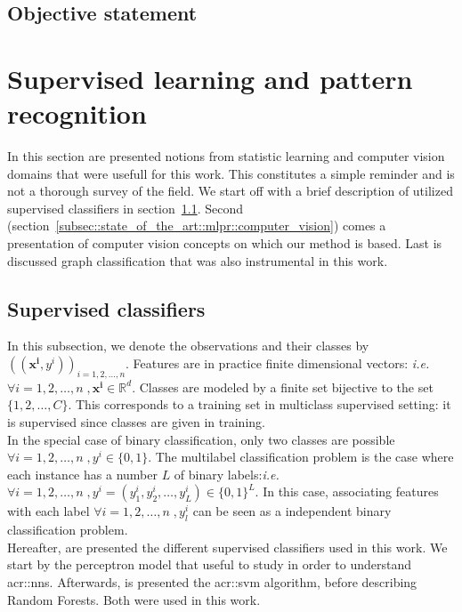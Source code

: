     \subsection{Objective statement}
\section{Supervised learning and pattern recognition}
    \label{sec::state_of_the_art::mlpr}
    In this section are presented notions from statistic learning and computer vision domains that were usefull for this work.
    This constitutes a simple reminder and is not a thorough survey of the field.
    We start off with a brief description of utilized supervised classifiers in section~\ref{subsec::state_of_the_art::mlpr::classifiers}.
    Second (section~\ref{subsec::state_of_the_art::mlpr::computer_vision}) comes a presentation of computer vision concepts on which our method is based.
    Last is discussed graph classification that was also instrumental in this work.

    \subsection{Supervised classifiers}
        \label{subsec::state_of_the_art::mlpr::classifiers}
        In this subsection, we denote the observations and their classes by $\left((\bm{x^i}, y^i)\right)_{i=1,2,\dots,n}$.
        Features are in practice finite dimensional vectors: \textit{i.e.} $\forall i=1,2,\dots,n \;, \bm{x^i} \in \mathbb{R}^d$.
        Classes are modeled by a finite set bijective to the set $\{1,2,\dots,C\}$.
        This corresponds to a training set in multiclass supervised setting: it is supervised since classes are given in training.\\

        In the special case of binary classification, only two classes are possible $\forall i=1,2,\dots,n \;,\allowbreak y^i \in \{0, 1\}$.
        The multilabel classification problem is the case where each instance has a number $L$ of binary labels:\textit{i.e.} $\forall i=1,2,\dots,n \;, y^i = (y^i_1, y^i_2, \dots, y^i_L) \in \{0, 1\}^L$.
        In this case, associating features with each label $\forall i=1,2,\dots,n \;, y^i_l$ can be seen as a independent binary classification problem.\\

        Hereafter, are presented the different supervised classifiers used in this work.
        We start by the perceptron model that useful to study in order to understand \glspl{acr::nn}.
        Afterwards, is presented the \gls{acr::svm} algorithm, before describing Random Forests.
        Both were used in this work.
